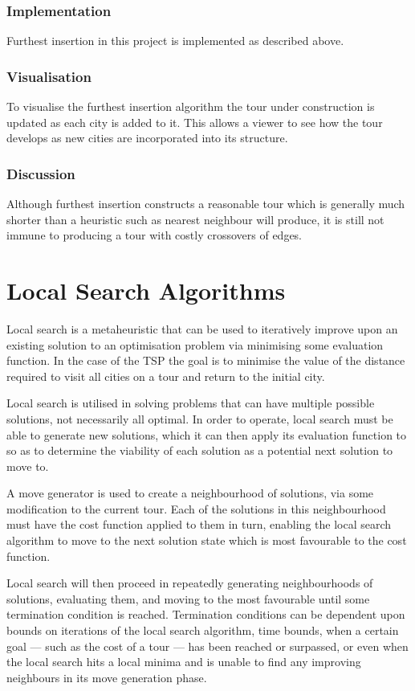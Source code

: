 \documentclass{l4proj}
\begin{document}
\subsubsection{Implementation}
Furthest insertion in this project is implemented as described above.

\subsubsection{Visualisation}
To visualise the furthest insertion algorithm the tour under construction is updated as each city is added to it. This allows a viewer to see how the tour develops as new cities are incorporated into its structure.


\subsubsection{Discussion}
Although furthest insertion constructs a reasonable tour which is generally much shorter than a heuristic such as nearest neighbour will produce, it is still not immune to producing a tour with costly crossovers of edges.


\section{Local Search Algorithms}
Local search is a metaheuristic that can be used to iteratively improve upon an existing solution to an optimisation problem via minimising some evaluation function. In the case of the TSP the goal is to minimise the value of the distance required to visit all cities on a tour and return to the initial city.

Local search is utilised in solving problems that can have multiple possible solutions, not necessarily all optimal. In order to operate, local search must be able to generate new solutions, which it can then apply its evaluation function to so as to determine the viability of each solution as a potential next solution to move to.

A move generator is used to create a neighbourhood of solutions, via some modification to the current tour. Each of the solutions in this neighbourhood must have the cost function applied to them in turn, enabling the local search algorithm to move to the next solution state which is most favourable to the cost function.

Local search will then proceed in repeatedly generating neighbourhoods of solutions, evaluating them, and moving to the most favourable until some termination condition is reached. Termination conditions can be dependent upon bounds on iterations of the local search algorithm, time bounds, when a certain goal --- such as the cost of a tour --- has been reached or surpassed, or even when the local search hits a local minima and is unable to find any improving neighbours in its move generation phase.
\end{document}
